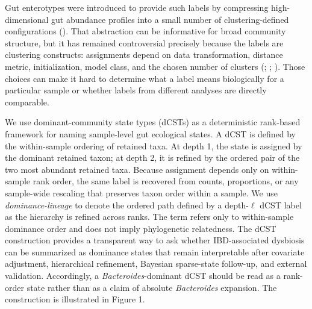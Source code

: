 \documentclass[
  11pt,
]{article}
\newcommand{\taxon}[1]{\emph{#1}}
\begin{document}
Gut enterotypes were introduced to provide such labels by compressing
high-dimensional gut abundance profiles into a small number of
clustering-defined configurations
(). That
abstraction can be informative for broad community structure, but it has
remained controversial precisely because the labels are clustering
constructs: assignments depend on data transformation, distance metric,
initialization, model class, and the chosen number of clusters
(;
;
). Those
choices can make it hard to determine what a label means biologically
for a particular sample or whether labels from different analyses are
directly comparable.

We use dominant-community state types (dCSTs) as a deterministic
rank-based framework for naming sample-level gut ecological states. A
dCST is defined by the within-sample ordering of retained taxa. At depth
1, the state is assigned by the dominant retained taxon; at depth 2, it
is refined by the ordered pair of the two most abundant retained taxa.
Because assignment depends only on within-sample rank order, the same
label is recovered from counts, proportions, or any sample-wide
rescaling that preserves taxon order within a sample. We use
\emph{dominance-lineage} to denote the ordered path defined by a
depth-\(\ell\) dCST label as the hierarchy is refined across ranks. The
term refers only to within-sample dominance order and does not imply
phylogenetic relatedness. The dCST construction provides a
transparent way to ask whether IBD-associated dysbiosis can be summarized
as dominance states that remain interpretable after covariate adjustment,
hierarchical refinement, Bayesian sparse-state follow-up, and external
validation. Accordingly, a \taxon{Bacteroides}-dominant dCST should be
read as a rank-order state rather than as a claim of absolute
\taxon{Bacteroides} expansion. The construction is illustrated in
Figure 1.
\end{document}

